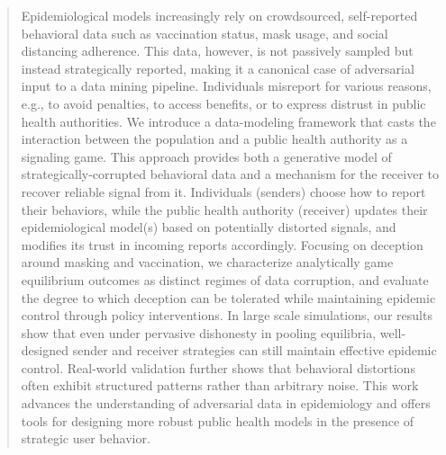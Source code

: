 \documentclass[sigconf,review]{acmart}
\begin{document}
\begin{abstract}
Epidemiological models increasingly rely on crowdsourced, self-reported behavioral data such as vaccination status, mask usage, and social distancing adherence. This data, however, is not passively sampled but instead strategically reported, making it a canonical case of adversarial input to a data mining pipeline. Individuals misreport for various reasons, e.g., to avoid penalties, to access benefits, or to express distrust in public health authorities. We introduce a data-modeling framework that casts the interaction between the population and a public health authority as a signaling game.
This approach provides both a generative model of strategically-corrupted behavioral data and a mechanism for the receiver to recover reliable signal from it. 
Individuals (senders) choose how to report their behaviors, while the public health authority (receiver) updates their epidemiological model(s) based on potentially distorted signals, and modifies its trust in incoming reports accordingly. Focusing on deception around masking and vaccination, we characterize analytically game equilibrium outcomes as distinct regimes of data corruption, and evaluate the degree to which deception can be tolerated while maintaining epidemic control through policy interventions.
In large scale simulations, our results show that even under pervasive dishonesty in pooling equilibria, well-designed sender and receiver strategies can still maintain effective epidemic control. Real-world validation further shows that behavioral distortions often exhibit structured patterns rather than arbitrary noise. This work advances the understanding of adversarial data in epidemiology and offers tools for designing more robust public health models in the presence of strategic user behavior.

\end{abstract}

\end{document}

